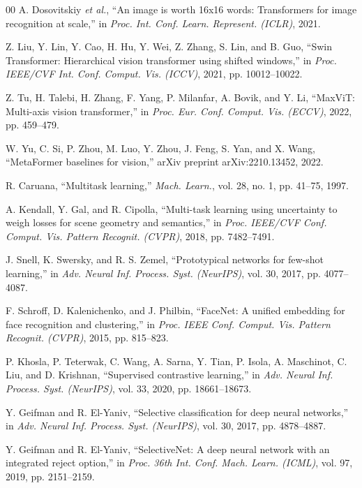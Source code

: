 \documentclass[conference]{IEEEtran}
\begin{document}
\begin{thebibliography}{00}
A. Dosovitskiy \emph{et al.}, ``An image is worth 16x16 words: Transformers for image recognition at scale,'' in \emph{Proc. Int. Conf. Learn. Represent. (ICLR)}, 2021.

Z. Liu, Y. Lin, Y. Cao, H. Hu, Y. Wei, Z. Zhang, S. Lin, and B. Guo, ``Swin Transformer: Hierarchical vision transformer using shifted windows,'' in \emph{Proc. IEEE/CVF Int. Conf. Comput. Vis. (ICCV)}, 2021, pp. 10012--10022.

Z. Tu, H. Talebi, H. Zhang, F. Yang, P. Milanfar, A. Bovik, and Y. Li, ``MaxViT: Multi-axis vision transformer,'' in \emph{Proc. Eur. Conf. Comput. Vis. (ECCV)}, 2022, pp. 459--479.

W. Yu, C. Si, P. Zhou, M. Luo, Y. Zhou, J. Feng, S. Yan, and X. Wang, ``MetaFormer baselines for vision,'' arXiv preprint arXiv:2210.13452, 2022.

R. Caruana, ``Multitask learning,'' \emph{Mach. Learn.}, vol. 28, no. 1, pp. 41--75, 1997.

A. Kendall, Y. Gal, and R. Cipolla, ``Multi-task learning using uncertainty to weigh losses for scene geometry and semantics,'' in \emph{Proc. IEEE/CVF Conf. Comput. Vis. Pattern Recognit. (CVPR)}, 2018, pp. 7482--7491.

J. Snell, K. Swersky, and R. S. Zemel, ``Prototypical networks for few-shot learning,'' in \emph{Adv. Neural Inf. Process. Syst. (NeurIPS)}, vol. 30, 2017, pp. 4077--4087.

F. Schroff, D. Kalenichenko, and J. Philbin, ``FaceNet: A unified embedding for face recognition and clustering,'' in \emph{Proc. IEEE Conf. Comput. Vis. Pattern Recognit. (CVPR)}, 2015, pp. 815--823.

P. Khosla, P. Teterwak, C. Wang, A. Sarna, Y. Tian, P. Isola, A. Maschinot, C. Liu, and D. Krishnan, ``Supervised contrastive learning,'' in \emph{Adv. Neural Inf. Process. Syst. (NeurIPS)}, vol. 33, 2020, pp. 18661--18673.

Y. Geifman and R. El-Yaniv, ``Selective classification for deep neural networks,'' in \emph{Adv. Neural Inf. Process. Syst. (NeurIPS)}, vol. 30, 2017, pp. 4878--4887.

Y. Geifman and R. El-Yaniv, ``SelectiveNet: A deep neural network with an integrated reject option,'' in \emph{Proc. 36th Int. Conf. Mach. Learn. (ICML)}, vol. 97, 2019, pp. 2151--2159.


\end{thebibliography}
\end{document}
